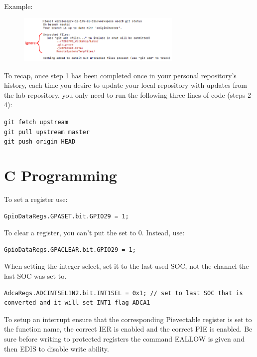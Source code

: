 \documentclass{article}
\begin{document}
\begin{enumerate}
  \\ Example:
  \begin{figure}[H]
    \centering
    \includegraphics[width = 0.7\textwidth]{Git_Step2c_Annotated.png} 
  \end{figure}
  To recap, once step 1 has been completed once in your personal repository's history, each time you desire to update your local repository with updates from the lab repository, you only need to run the following three lines of code (steps 2-4):
  \begin{center}
      \verb|git fetch upstream| \\
      \verb|git pull upstream master| \\
      \verb|git push origin HEAD|
  \end{center}
\end{enumerate}


\pagebreak

\section{C Programming}

To set a register use:

\begin{lstlisting}[style=CStyle]
        GpioDataRegs.GPASET.bit.GPIO29 = 1;
\end{lstlisting}

To clear a register, you can't put the set to 0. Instead, use:

\begin{lstlisting}[style=CStyle]
        GpioDataRegs.GPACLEAR.bit.GPIO29 = 1;
\end{lstlisting}

When setting the integer select, set it to the last used SOC, not the channel the last SOC was set to.

\begin{lstlisting}[style=CStyle]
    AdcaRegs.ADCINTSEL1N2.bit.INT1SEL = 0x1; // set to last SOC that is converted and it will set INT1 flag ADCA1
\end{lstlisting}

To setup an interrupt ensure that the corresponding Pievectable register is set to the function name, the correct IER is enabled and the correct PIE is enabled. Be sure before writing to protected registers the command EALLOW is given and then EDIS to disable write ability.
\end{document}

